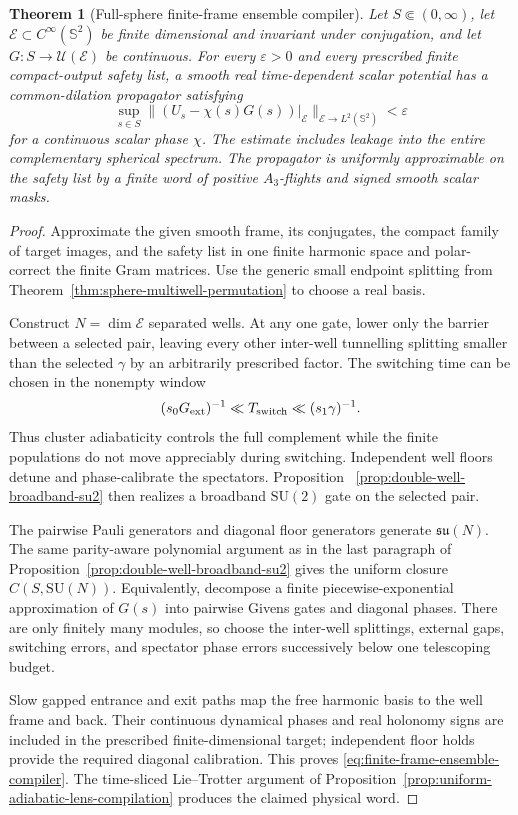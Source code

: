 \documentclass[11pt]{article}
\newtheorem{theorem}{Theorem}[section]
\theoremstyle{remark}
\begin{document}
\begin{theorem}[Full-sphere finite-frame ensemble compiler]
\label{thm:sphere-finite-frame-compiler}
Let $S\Subset(0,\infty)$, let
$\mathcal E\subset C^\infty(\mathbb S^2)$ be finite dimensional and invariant
under conjugation, and let $G:S\to\mathcal U(\mathcal E)$ be continuous.
For every $\varepsilon>0$ and every prescribed finite compact-output safety
list, a smooth real time-dependent scalar potential has a common-dilation
propagator satisfying
\begin{equation}
 \sup_{s\in S}
 \|(U_s-\chi(s)G(s))|_{\mathcal E}\|_{\mathcal E\to L^2(\mathbb S^2)}
 <\varepsilon
 \label{eq:finite-frame-ensemble-compiler}
\end{equation}
for a continuous scalar phase $\chi$.  The estimate includes leakage into
the entire complementary spherical spectrum.  The propagator is uniformly
approximable on the safety list by a finite word of positive $A_3$-flights
and signed smooth scalar masks.
\end{theorem}

\begin{proof}
Approximate the given smooth frame, its conjugates, the compact family of
target images, and the safety list in one finite harmonic space and
polar-correct the finite Gram matrices.  Use the generic small endpoint
splitting from Theorem~\ref{thm:sphere-multiwell-permutation} to choose a
real basis.

Construct $N=\dim\mathcal E$ separated wells.  At any one gate, lower only
the barrier between a selected pair, leaving every other inter-well
tunnelling splitting smaller than the selected $\gamma$ by an arbitrarily
prescribed factor.  The switching time can be chosen in the nonempty window
\[
 (s_0G_{\rm ext})^{-1}\ll T_{\rm switch}
 \ll(s_1\gamma)^{-1}.
\]
Thus cluster adiabaticity controls the full complement while the finite
populations do not move appreciably during switching.  Independent well
floors detune and phase-calibrate the spectators.  Proposition
~\ref{prop:double-well-broadband-su2} then realizes a broadband
$\mathrm{SU}(2)$ gate on the selected pair.

The pairwise Pauli generators and diagonal floor generators generate
$\mathfrak{su}(N)$.  The same parity-aware polynomial argument as in the
last paragraph of Proposition~\ref{prop:double-well-broadband-su2} gives
the uniform closure $C(S,\mathrm{SU}(N))$.  Equivalently, decompose a finite
piecewise-exponential approximation of $G(s)$ into pairwise Givens gates and
diagonal phases.  There are only finitely many modules, so choose the
inter-well splittings, external gaps, switching errors, and spectator phase
errors successively below one telescoping budget.

Slow gapped entrance and exit paths map the free harmonic basis to the well
frame and back.  Their continuous dynamical phases and real holonomy signs
are included in the prescribed finite-dimensional target; independent floor
holds provide the required diagonal calibration.  This proves
\eqref{eq:finite-frame-ensemble-compiler}.  The time-sliced Lie--Trotter
argument of Proposition~\ref{prop:uniform-adiabatic-lens-compilation}
produces the claimed physical word.
\end{proof}
\end{document}
